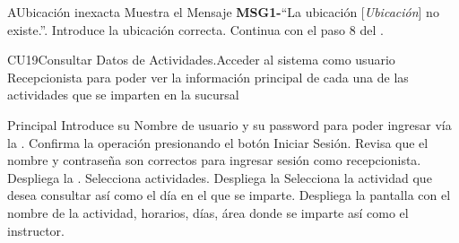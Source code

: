 		\begin{UCtrayectoriaA}{A}{Ubicación inexacta}
			\UCpaso[\UCactor] Muestra el Mensaje {\bf MSG1-}``La ubicación [{\em Ubicación}] no existe.''.
			\UCpaso[\UCactor] Introduce la ubicación correcta.
			\UCpaso[] Continua con el paso 8 del .
		\end{UCtrayectoriaA}
		


\begin{UseCase}{CU19}{Consultar Datos de Actividades.}{Acceder al sistema como usuario Recepcionista para 
poder ver la información principal de cada una de las actividades que se imparten en la sucursal}
	\end{UseCase}
	\begin{UCtrayectoria}{Principal}
		\UCpaso[\UCactor] Introduce su Nombre de usuario y su password para poder ingresar vía la  \label{CU1LoginJI}.
		\UCpaso[\UCactor] Confirma la operación presionando el botón Iniciar Sesión.
		\UCpaso Revisa que el nombre y contraseña son correctos para ingresar sesión como recepcionista.
		\UCpaso Despliega la .
		\UCpaso[\UCactor]Selecciona actividades.
		\UCpaso Despliega la 
		\UCpaso[\UCactor]Selecciona la actividad que desea consultar así como el día en el que se imparte.
		\UCpaso Despliega la pantalla con el nombre de la actividad, horarios, días, área donde se imparte así como el instructor.

	\end{UCtrayectoria}

